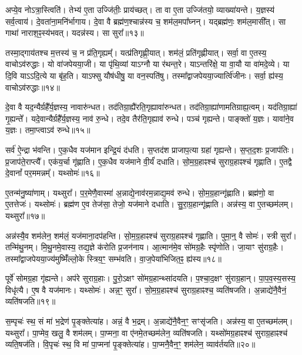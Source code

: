 अप्ये॒व नोऽत्रा॒स्त्विति॑।
तेभ्य॑ ए॒ता उज्जि॑तीः॒ प्राय॑च्छत्।
ता वा ए॒ता उज्जि॑तयो॒ व्याख्या॑यन्ते।
य॒ज्ञस्य॑ सर्व॒त्वाय॑।
दे॒वता॑ना॒मनि॑र्भागाय।
दे॒वा वै ब्रह्म॑ण॒श्चान्न॑स्य च॒ शम॑ल॒मपा᳚घ्नन्।
यद्ब्रह्म॑णः॒ शम॑ल॒मासी᳚त्।
सा गाथा॑ नाराश॒ꣴ॒स्य॑भवत्।
यदन्न॑स्य।
सा सुरा᳚॥१३॥

तस्मा॒द्गाय॑तश्च म॒त्तस्य॑ च॒ न प्र॑ति॒गृह्यम्᳚।
यत्प्र॑तिगृह्णी॒यात्।
शम॑लं॒ प्रति॑\-गृह्णीयात्।
सर्वा॒ वा ए॒तस्य॒ वाचो\-ऽव॑रुद्धाः।
यो वा॑जपेयया॒जी।
या पृ॑थि॒व्यां याऽग्नौ या र॑थन्त॒रे।
याऽन्तरि॑क्षे॒ या वा॒यौ या वा॑मदे॒व्ये।
या दि॒वि याऽऽदि॒त्ये या बृ॑ह॒ति।
याऽफ्सु यौष॑धीषु॒ या वन॒स्पति॑षु।
तस्मा᳚द्वाजपेयया॒ज्यार्त्वि॑जीनः।
सर्वा॒ ह्य॑स्य॒ वाचो\-ऽव॑रुद्धाः॥१४॥\anuvakamend[धा॒वा॒मेति॒ ज्यैष्ठ्या॑य॒ वेद॑ ब्र॒ह्मा जा॑यते वाज॒पेयः॒ सुरा\-ऽऽर्त्वि॑जीन॒ एकं॑ च]

दे॒वा वै यद॒न्यैर्ग्रहै᳚र्य॒ज्ञस्य॒ नावारु॑न्धत।
तद॑तिग्रा॒ह्यै॑रति॒\-गृह्या\-वा॑रुन्धत।
तद॑तिग्रा॒ह्या॑णामतिग्राह्य॒त्वम्।
यद॑तिग्रा॒ह्या॑ गृ॒ह्यन्ते᳚।
यदे॒वान्यैर्ग्रहै᳚र्य॒ज्ञस्य॒ नाव॑ रु॒न्धे।
तदे॒व तैर॑ति॒गृह्या\-व॑ रुन्धे।
पञ्च॑ गृह्यन्ते।
पाङ्क्तो॑ य॒ज्ञः।
यावा॑ने॒व य॒ज्ञः।
तमा॒प्त्वा\-ऽव॑ रुन्धे॥१५॥

सर्व॑ ऐ॒न्द्रा भ॑वन्ति।
ए॒क॒धैव यज॑मान इन्द्रि॒यं द॑धति।
स॒प्तद॑श प्राजाप॒त्या ग्रहा॑ गृह्यन्ते।
स॒प्त॒द॒शः प्र॒जा\-प॑तिः।
प्र॒जा\-प॑ते॒राप्त्यै᳚।
एक॑य॒र्चा गृ॑ह्णाति।
ए॒क॒धैव यज॑माने वी॒र्यं॑ दधाति।
सो॒म॒ग्र॒हाꣴश्च॑ सुराग्र॒हाꣴश्च॑ गृह्णाति।
ए॒तद्वै दे॒वानां᳚ पर॒ममन्नम्᳚।
यथ्सोमः॑॥१६॥

ए॒तन्म॑नु॒ष्या॑णाम्।
यथ्सुरा᳚।
प॒र॒मेणै॒वास्मा॑ अ॒न्नाद्ये॒नाव॑र\-म॒न्नाद्य॒मव॑ रुन्धे।
सो॒म॒ग्र॒हान्गृ॑ह्णाति।
ब्रह्म॑णो॒ वा ए॒तत्तेजः॑।
यथ्सोमः॑।
ब्रह्म॑ण ए॒व तेज॑सा॒ तेजो॒ यज॑माने दधाति।
सु॒रा॒ग्र॒हान्गृ॑ह्णाति।
अन्न॑स्य॒ वा ए॒तच्छम॑लम्।
यथ्सुरा᳚॥१७॥

अन्न॑स्यै॒व शम॑लेन॒ शम॑लं॒ यज॑माना॒दप॑हन्ति।
सो॒म॒ग्र॒हाꣴश्च॑ सुराग्र॒हाꣴश्च॑ गृह्णाति।
पुमा॒न्॒ वै सोमः॑।
स्त्री सुरा᳚।
तन्मि॑थु॒नम्।
मि॒थु॒नमे॒वास्य॒ तद्य॒ज्ञे क॑रोति प्र॒जन॑नाय।
आ॒त्मान॑मे॒व सो॑मग्र॒हैः स्पृ॑णोति।
जा॒याꣳ सु॑राग्र॒हैः।
तस्मा᳚द्वाजपेयया॒ज्य॑मुष्मिँ॑ल्लो॒के स्त्रिय॒ꣳ॒ सम्भ॑वति।
वा॒ज॒पेया॑भिजित॒ꣴ॒ ह्य॑स्य॥१८॥

पूर्वे॑ सोमग्र॒हा गृ॑ह्यन्ते।
अप॑रे सुराग्र॒हाः।
पु॒रो॒\-ऽक्षꣳ सो॑मग्र॒हान्थ्सा॑दयति।
प॒श्चा॒द॒क्षꣳ सु॑राग्र॒हान्।
पा॒प॒व॒स्य॒सस्य॒ विधृ॑त्यै।
ए॒ष वै यज॑मानः।
यथ्सोमः॑।
अन्न॒ꣳ॒ सुरा᳚।
सो॒म॒ग्र॒हाꣴश्च॑ सुराग्र॒हाꣴश्च॒ व्यति॑षजति।
अ॒न्नाद्ये॑नै॒वैनं॒ व्यति॑षजति॥१९॥

स॒म्पृचः॑ स्थ॒ सं मा॑ भ॒द्रेण॑ पृ॒ङ्क्तेत्या॑ह।
अन्नं॒ वै भ॒द्रम्।
अ॒न्ना\-द्ये॑नै॒वैन॒ꣳ॒ सꣳसृ॑जति।
अन्न॑स्य॒ वा ए॒तच्छम॑लम्।
यथ्सुरा᳚।
पा॒प्मेव॒ खलु॒ वै शम॑लम्।
पा॒प्मना॒ वा ए॑नमे॒तच्छम॑लेन॒ व्यति॑षजति।
यथ्सो॑मग्र॒हाꣴश्च॑ सुराग्र॒हाꣴश्च॑ व्यति॒षज॑ति।
वि॒पृचः॑ स्थ॒ वि मा॑ पा॒प्मना॑ पृ॒ङ्क्तेत्या॑ह।
पा॒प्मनै॒वैन॒ꣳ॒ शम॑लेन॒ व्याव॑र्तयति॥२०॥

